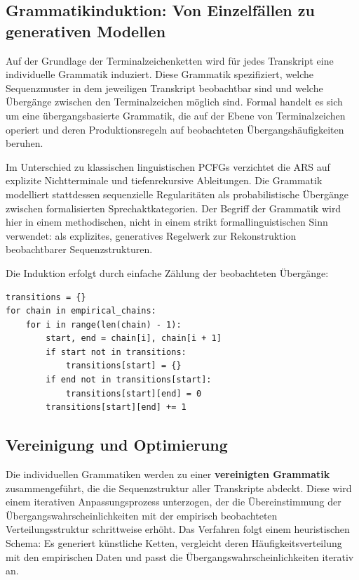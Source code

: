 \documentclass[
  12pt,
  a4paper,
  oneside,
  titlepage
]{article}
\begin{document}
\subsection{Grammatikinduktion: Von Einzelfällen zu generativen Modellen}

Auf der Grundlage der Terminalzeichenketten wird für jedes Transkript eine 
individuelle Grammatik induziert. Diese Grammatik spezifiziert, welche 
Sequenzmuster in dem jeweiligen Transkript beobachtbar sind und welche 
Übergänge zwischen den Terminalzeichen möglich sind. Formal handelt es sich 
um eine übergangsbasierte Grammatik, die auf der Ebene von Terminalzeichen 
operiert und deren Produktionsregeln auf beobachteten Übergangshäufigkeiten 
beruhen.

Im Unterschied zu klassischen linguistischen PCFGs \citep{Manning1999} verzichtet 
die ARS auf explizite Nichtterminale und tiefenrekursive Ableitungen. Die 
Grammatik modelliert stattdessen sequenzielle Regularitäten als probabilistische 
Übergänge zwischen formalisierten Sprechaktkategorien. Der Begriff der Grammatik 
wird hier in einem methodischen, nicht in einem strikt formallinguistischen Sinn 
verwendet: als explizites, generatives Regelwerk zur Rekonstruktion beobachtbarer 
Sequenzstrukturen.

Die Induktion erfolgt durch einfache Zählung der beobachteten Übergänge:

\begin{lstlisting}[caption=Zählung der Übergänge zwischen Terminalzeichen]
transitions = {}
for chain in empirical_chains:
    for i in range(len(chain) - 1):
        start, end = chain[i], chain[i + 1]
        if start not in transitions:
            transitions[start] = {}
        if end not in transitions[start]:
            transitions[start][end] = 0
        transitions[start][end] += 1
\end{lstlisting}

\subsection{Vereinigung und Optimierung}

Die individuellen Grammatiken werden zu einer \textbf{vereinigten Grammatik} 
zusammengeführt, die die Sequenzstruktur aller Transkripte abdeckt. Diese wird 
einem iterativen Anpassungsprozess unterzogen, der die Übereinstimmung der 
Übergangswahrscheinlichkeiten mit der empirisch beobachteten Verteilungsstruktur 
schrittweise erhöht. Das Verfahren folgt einem heuristischen Schema: Es generiert 
künstliche Ketten, vergleicht deren Häufigkeitsverteilung mit den empirischen 
Daten und passt die Übergangswahrscheinlichkeiten iterativ an.
\end{document}
